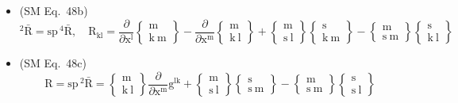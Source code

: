 \documentclass[
    12pt,              %
    a4paper,           %
    headings=normal,   %
    twoside=true,      %
    BCOR=8mm,          %
]{scrbook}
\begin{document}
\begin{itemize}[label={},leftmargin=0pt]
    \item (SM Eq.\ 48b) 
    \[
    {}^2\bar{\mathrm{R}} = \mathrm{sp} \, {}^4\bar{\mathrm{R}}, \quad \mathrm{R}_{\mathrm{kl}} = \frac{\partial}{\partial \mathrm{x^l}}\left\{ \begin{smallmatrix} \mathrm{m} \\ \mathrm{k\ m} \end{smallmatrix} \right\} - \frac{\partial}{\partial \mathrm{x^m}}\left\{ \begin{smallmatrix} \mathrm{m} \\ \mathrm{k\ l} \end{smallmatrix} \right\} + \left\{ \begin{smallmatrix} \mathrm{m} \\ \mathrm{s\ l} \end{smallmatrix} \right\}\left\{ \begin{smallmatrix} \mathrm{s} \\ \mathrm{k\ m} \end{smallmatrix} \right\} - \left\{ \begin{smallmatrix} \mathrm{m} \\ \mathrm{s\ m} \end{smallmatrix} \right\}\left\{ \begin{smallmatrix} \mathrm{s} \\ \mathrm{k\ l} \end{smallmatrix} \right\}
    \]

    \item (SM Eq.\ 48c) 
    \[
    \mathrm{R} = \mathrm{sp} \, {}^2\bar{\mathrm{R}} = \left\{ \begin{smallmatrix} \mathrm{m} \\ \mathrm{k\ l} \end{smallmatrix} \right\}\frac{\partial}{\partial \mathrm{x^m}} \mathrm{g}^{\mathrm{lk}} + \left\{ \begin{smallmatrix} \mathrm{m} \\ \mathrm{s\ l} \end{smallmatrix} \right\}\left\{ \begin{smallmatrix} \mathrm{s} \\ \mathrm{s\ m} \end{smallmatrix} \right\} - \left\{ \begin{smallmatrix} \mathrm{m} \\ \mathrm{s\ m} \end{smallmatrix} \right\}\left\{ \begin{smallmatrix} \mathrm{s} \\ \mathrm{s\ l} \end{smallmatrix} \right\}
    \]


\end{itemize}
\end{document}
